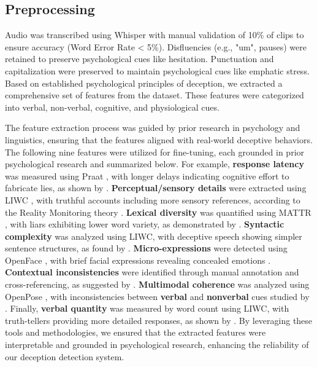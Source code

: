 \documentclass[11pt]{article}
\begin{document}
\subsection{Preprocessing}
Audio was transcribed using Whisper \citep{radford2022whisper} with manual validation of 10\% of clips to ensure accuracy (Word Error Rate < 5\%). Disfluencies (e.g., "um", pauses) were retained to preserve psychological cues like hesitation. Punctuation and capitalization were preserved to maintain psychological cues like emphatic stress. Based on established psychological principles of deception, we extracted a comprehensive set of features from the dataset. These features were categorized into verbal, non-verbal, cognitive, and physiological cues.

The feature extraction process was guided by prior research in psychology and linguistics, ensuring that the features aligned with real-world deceptive behaviors. The following nine features were utilized for fine-tuning, each grounded in prior psychological research and summarized below. For example, \textbf{response latency} was measured using Praat \citep{Boersma2001}, with longer delays indicating cognitive effort to fabricate lies, as shown by \citep{Vrij2011}. \textbf{Perceptual/sensory details} were extracted using LIWC \citep{Pennebaker2015}, with truthful accounts including more sensory references, according to the Reality Monitoring theory \citep{Sporer1997}. \textbf{Lexical diversity} was quantified using MATTR \citep{Covington2010}, with liars exhibiting lower word variety, as demonstrated by \citep{Newman2003}. \textbf{Syntactic complexity} was analyzed using LIWC, with deceptive speech showing simpler sentence structures, as found by \citep{Hancock2008}. \textbf{Micro-expressions} were detected using OpenFace \citep{Baltrušaitis2018}, with brief facial expressions revealing concealed emotions \citep{Porter2008}. \textbf{Contextual inconsistencies }were identified through manual annotation and cross-referencing, as suggested by \citep{10.1177/0261927X02021004006}. \textbf{Multimodal coherence} was analyzed using OpenPose \citep{Cao2017}, with inconsistencies between \textbf{verbal} and \textbf{nonverbal} cues studied by \citep{10.1177/0261927X02021004008}. Finally, \textbf{verbal quantity} was measured by word count using LIWC, with truth-tellers providing more detailed responses, as shown by \citep{10.1177/0963721410391245}. By leveraging these tools and methodologies, we ensured that the extracted features were interpretable and grounded in psychological research, enhancing the reliability of our deception detection system. 
\end{document}
